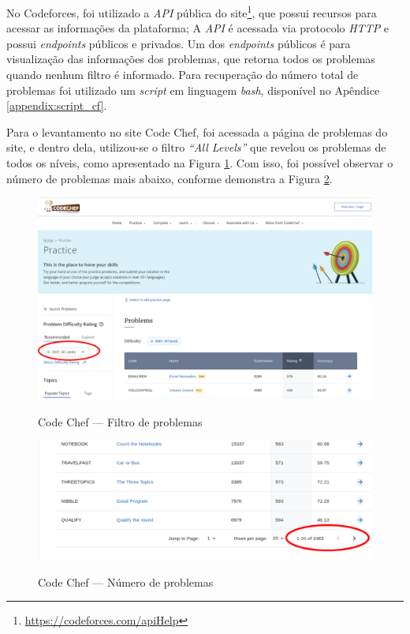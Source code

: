 No Codeforces, foi utilizado a \textit{API} pública do site\footnote{\url{https://codeforces.com/apiHelp}}, que possui recursos para acessar as informações da plataforma; A \textit{API} é acessada via protocolo \textit{HTTP} e possui \textit{endpoints} públicos e privados. Um dos \textit{endpoints} públicos é para visualização das informações dos problemas, que retorna todos os problemas quando nenhum filtro é informado. Para recuperação do número total de problemas foi utilizado um \textit{script} em linguagem \textit{bash}, disponível no Apêndice \ref{appendix:script_cf}.

Para o levantamento no site Code Chef, foi acessada a página de problemas do site, e dentro dela, utilizou-se o filtro \textit{``All Levels''} que revelou os problemas de todos os níveis, como apresentado na Figura \ref{fig:code_chef_1}. Com isso, foi possível observar o número de problemas mais abaixo, conforme demonstra a Figura \ref{fig:code_chef_2}.

\begin{figure}[H]
    \centering
    \caption{Code Chef — Filtro de problemas}
    \includegraphics[keepaspectratio=true,scale=0.3]{figuras/code_chef_1.eps}
    \label{fig:code_chef_1}
\end{figure}

\begin{figure}[H]
    \centering
    \caption{Code Chef — Número de problemas}
    \includegraphics[keepaspectratio=true,scale=0.3]{figuras/code_chef_2.eps}
    \label{fig:code_chef_2}
\end{figure}

